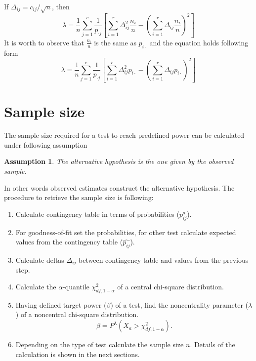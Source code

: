 \documentclass{article}
\newtheorem{assumption}{Assumption}
\begin{document}
If $\Delta_{ij} = c_{ij}/\sqrt{n}$, then 
\begin{equation}
    \lambda = \frac{1}{n}\sum_{j=1}^{c}\frac{1}{p_{\cdot j}}\left[ \sum_{i=1}^{r} \Delta_{ij}^2 \frac{n_i}{n} -  \left(\sum_{i=1}^{r} \Delta_{ij} \frac{n_i}{n}\right)^2  \right]
\end{equation}
It is worth to observe that $\frac{n_i}{n}$ is the same as $p_{i\cdot}$ and the equation holds following form
\begin{equation}\label{homogeneity_lambda}
    \lambda = \frac{1}{n}\sum_{j=1}^{c}\frac{1}{p_{\cdot j}}\left[ \sum_{i=1}^{r} \Delta_{ij}^2 p_{i\cdot} -  \left(\sum_{i=1}^{r} \Delta_{ij} p_{i\cdot}\right)^2  \right]
\end{equation}

\section{Sample size}
The sample size required for a test to reach predefined power can be calculated
under following assumption 

\begin{assumption}
The alternative hypothesis is the one given by the observed sample. 
\end{assumption} 
In other words observed estimates construct the alternative hypothesis. The 
procedure to retrieve the sample size is following:

\begin{enumerate}
    \item Calculate contingency table in terms of probabilities ($p^a_{ij}$).
    \item For goodness-of-fit set the probabilities, for other test calculate expected values from the contingency table ($\widehat{p_{ij}}$).
    \item Calculate deltas $\Delta_{ij}$ between contingency table and values from the previous step.
    \item Calculate the $\alpha$-quantile $\chi^2_{df,1-\alpha}$ of a central chi-square distribution.
    \item Having defined target power ($\beta$) of a test, find the noncentrality parameter ($\lambda$) of a noncentral chi-square distribution.
    \begin{equation}
        \beta = P^\lambda\left(X_a > \chi^2_{df,1-\alpha} \right).
    \end{equation}
    \item Depending on the type of test calculate the sample size $n$. Details of the calculation is shown in the next sections.
\end{enumerate}
\end{document}

